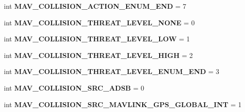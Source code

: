 \begin{DoxyCompactItemize}
\item 
\mbox{\label{namespacepymavlink_1_1dialects_1_1v10_a41fdd0ded9dce446b0998b4d802014af}} 
int {\bfseries M\+A\+V\+\_\+\+C\+O\+L\+L\+I\+S\+I\+O\+N\+\_\+\+A\+C\+T\+I\+O\+N\+\_\+\+E\+N\+U\+M\+\_\+\+E\+ND} = 7
\item 
\mbox{\label{namespacepymavlink_1_1dialects_1_1v10_abf9470915a8c00efb21559e191b932f0}} 
int {\bfseries M\+A\+V\+\_\+\+C\+O\+L\+L\+I\+S\+I\+O\+N\+\_\+\+T\+H\+R\+E\+A\+T\+\_\+\+L\+E\+V\+E\+L\+\_\+\+N\+O\+NE} = 0
\item 
\mbox{\label{namespacepymavlink_1_1dialects_1_1v10_ac1c9e578c13a409d7eca7d1a7ab75ed2}} 
int {\bfseries M\+A\+V\+\_\+\+C\+O\+L\+L\+I\+S\+I\+O\+N\+\_\+\+T\+H\+R\+E\+A\+T\+\_\+\+L\+E\+V\+E\+L\+\_\+\+L\+OW} = 1
\item 
\mbox{\label{namespacepymavlink_1_1dialects_1_1v10_a083ff3b1ffe417b3d981af7b0eed9aba}} 
int {\bfseries M\+A\+V\+\_\+\+C\+O\+L\+L\+I\+S\+I\+O\+N\+\_\+\+T\+H\+R\+E\+A\+T\+\_\+\+L\+E\+V\+E\+L\+\_\+\+H\+I\+GH} = 2
\item 
\mbox{\label{namespacepymavlink_1_1dialects_1_1v10_abb06c53c93bc2a6f018ef1b2f5fe5bc7}} 
int {\bfseries M\+A\+V\+\_\+\+C\+O\+L\+L\+I\+S\+I\+O\+N\+\_\+\+T\+H\+R\+E\+A\+T\+\_\+\+L\+E\+V\+E\+L\+\_\+\+E\+N\+U\+M\+\_\+\+E\+ND} = 3
\item 
\mbox{\label{namespacepymavlink_1_1dialects_1_1v10_a74e12e1a89c4545ab08388b1ec5ce1fb}} 
int {\bfseries M\+A\+V\+\_\+\+C\+O\+L\+L\+I\+S\+I\+O\+N\+\_\+\+S\+R\+C\+\_\+\+A\+D\+SB} = 0
\item 
\mbox{\label{namespacepymavlink_1_1dialects_1_1v10_aef6f4746c2e939d132208e309a8f80f3}} 
int {\bfseries M\+A\+V\+\_\+\+C\+O\+L\+L\+I\+S\+I\+O\+N\+\_\+\+S\+R\+C\+\_\+\+M\+A\+V\+L\+I\+N\+K\+\_\+\+G\+P\+S\+\_\+\+G\+L\+O\+B\+A\+L\+\_\+\+I\+NT} = 1
\item 
\mbox{\label{namespacepymavlink_1_1dialects_1_1v10_ab86fdfb09bc3040d2679777595daee61}} 

\end{DoxyCompactItemize}
